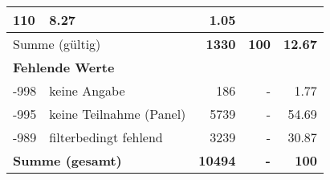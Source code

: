 \begin{longtable}{lXrrr}
       \num{110} &
       \num[round-mode=places,round-precision=2]{8,27} &
         \num[round-mode=places,round-precision=2]{1,05} \\
     \midrule
     \multicolumn{2}{l}{Summe (gültig)} &
       \textbf{\num{1330}} &
     \textbf{100} &
       \textbf{\num[round-mode=places,round-precision=2]{12,67}} \\
     \multicolumn{5}{l}{\textbf{Fehlende Werte}}\\
       -998 &
       keine Angabe &
         \num{186} &
        - &
         \num[round-mode=places,round-precision=2]{1,77} \\
       -995 &
       keine Teilnahme (Panel) &
         \num{5739} &
        - &
         \num[round-mode=places,round-precision=2]{54,69} \\
       -989 &
       filterbedingt fehlend &
         \num{3239} &
        - &
         \num[round-mode=places,round-precision=2]{30,87} \\
     \midrule
     \multicolumn{2}{l}{\textbf{Summe (gesamt)}} &
          \textbf{\num{10494}} &
        \textbf{-} &
        \textbf{100} \\
     \bottomrule
     \end{longtable}
     
